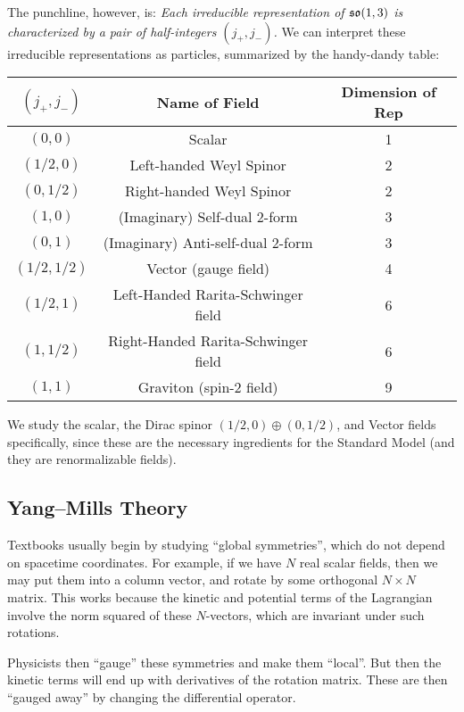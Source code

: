 The punchline, however, is: \textit{Each irreducible representation of $\mathfrak{so}(1,3)$
is characterized by a pair of half-integers $(j_{+}, j_{-})$.} We can
interpret these irreducible representations as particles, summarized by
the handy-dandy table:

\begin{center}
\begin{tabular}{c|c|c}
  $(j_{+}, j_{-})$ & Name of Field & Dimension of Rep \\\hline
  $(0, 0)$ &	Scalar  &	1\\
$(1/2, 0)$ & 	Left-handed Weyl Spinor &	2\\
$(0, 1/2)$ &	Right-handed Weyl Spinor &	2\\
$(1, 0)$ &	(Imaginary) Self-dual 2-form &	3\\
$(0, 1)$ &	(Imaginary) Anti-self-dual 2-form &	3\\
$(1/2, 1/2)$ &	Vector (gauge field) &	4\\
$(1/2, 1)$ & 	Left-Handed Rarita-Schwinger field &	6\\
$(1, 1/2)$ &	Right-Handed Rarita-Schwinger field &	6\\
$(1, 1)$ &	Graviton (spin-2 field) &	9
\end{tabular}
\end{center}

\M
We study the scalar, the Dirac spinor $(1/2, 0)\oplus(0, 1/2)$, and
Vector fields specifically, since these are the necessary ingredients
for the Standard Model (and they are renormalizable fields).

\subsection{Yang--Mills Theory}

Textbooks usually begin by studying ``global symmetries'', which do not
depend on spacetime coordinates. For example, if we have $N$ real scalar
fields, then we may put them into a column vector, and rotate by some
orthogonal $N\times N$ matrix. This works because the kinetic and
potential terms of the Lagrangian involve the norm squared of these
$N$-vectors, which are invariant under such rotations.

Physicists then ``gauge'' these symmetries and make them ``local''. But
then the kinetic terms will end up with derivatives of the rotation
matrix. These are then ``gauged away'' by changing the differential
operator.

